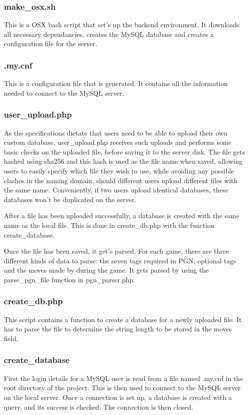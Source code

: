 \documentclass{article}
\begin{document}
\subsubsection{make\_osx.sh}
This is a OSX bash script that set's up the backend environment. It downloads all necessary dependancies, creates the MySQL database and creates a configuration file for the server.

\subsubsection{.my.cnf}
This is a configuration file that is generated. It contains all the information needed to connect to the MySQL server.

\subsubsection{user\_upload.php}
As the specifications dictate that users need to be able to upload their own custom database, user\_upload.php receives such uploads and performs some basic checks on the uploaded file, before saving it to the server disk.  The file gets hashed using sha256 and this hash is used as the file name when saved, allowing users to easily specify which file they wish to use, while avoiding any possible clashes in the naming domain, should different users upload different files with the same name.  Conveniently, if two users upload identical databases, these databases won't be duplicated on the server. 

After a file has been uploaded successfully, a database is created with the same name as the local file.  This is done in create\_db.php with the function create\_database.

Once the file has been saved, it get's parsed. For each game, there are three different kinds of data to parse:  the seven tags required in PGN, optional tags and the moves made by during the game.  It gets parsed by using the parse\_pgn\_file function in pgn\_parser.php.


\subsubsection{create\_db.php}
This script contains a function to create a database for a newly uploaded file. It has to parse the file to determine the string length to be stored in the moves field. 

\subsubsection*{create\_database}
First the login details for a MySQL user is read from a file named .my.cnf in the root directory of the project.  This is then used to connect to the MySQL server on the local server.  Once a connection is set up, a database is created with a query, and its success is checked.  The connection is then closed.  
\end{document}
